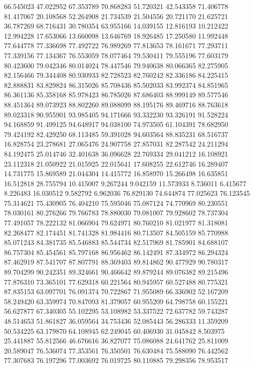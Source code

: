 66.545023
47.022952
67.353789
70.868283
51.720321
42.543358
71.406778
81.417067
20.108568
52.264908
21.734539
21.504556
20.721170
21.625721
36.787269
68.716431
30.780354
63.955166
14.039155
12.816193
10.212422
12.994228
17.653066
13.660098
13.646769
18.926485
17.250580
11.992448
77.644778
77.336698
77.492722
76.989269
77.813653
78.161671
77.293711
77.339156
77.134367
76.553059
78.077464
79.530411
79.555196
77.603179
80.423600
79.042346
80.014024
78.447546
79.940638
80.066365
82.275905
82.156466
79.344408
80.930933
82.728523
82.760242
82.336186
84.225415
82.888831
83.829824
86.315026
85.708436
85.502033
83.992374
84.851965
86.361136
85.358168
85.978423
86.785026
87.686403
88.999149
89.577546
88.451364
89.073923
88.802260
89.088099
88.195176
89.469716
88.763618
89.023318
90.955901
93.985405
94.171666
93.332230
93.326191
91.528224
94.168859
91.499125
94.648917
94.038100
74.973505
61.104391
78.682950
79.424192
82.429250
68.113485
59.391028
94.603564
88.835231
68.516737
16.828754
23.278681
27.065476
24.907758
27.857031
82.287542
24.211294
84.192475
25.014746
32.401638
36.096628
22.769334
29.041212
16.108921
23.112318
21.050922
21.015925
22.015641
17.608255
22.612746
16.289407
14.731775
15.869589
21.044304
14.415772
16.858970
15.266498
16.635851
16.512818
28.755794
10.415007
9.267244
9.042159
11.573933
8.736011
6.415677
8.226483
16.030512
9.582792
6.962036
76.829130
74.644874
77.025623
76.123545
75.314621
75.430905
76.404210
75.595046
75.087124
74.770969
80.230551
78.030161
80.276266
79.766783
78.880030
79.081007
79.928602
78.737304
77.491057
78.222132
81.066904
79.624971
80.760210
81.021977
81.318081
82.268477
82.174451
81.741328
81.984416
80.713507
84.505159
85.770988
85.071243
84.381735
85.546883
85.544734
82.517969
81.785901
84.688107
86.757304
85.454561
85.797168
86.956462
86.142491
87.334972
86.294324
87.462919
87.541707
87.807791
88.369403
89.814862
90.477929
90.780317
89.704299
90.242351
89.324661
90.466642
89.879244
89.076382
89.215496
77.876310
73.365101
77.629318
60.221564
80.945957
60.527488
80.775321
87.835153
63.097701
76.091374
70.722867
71.955089
66.336902
52.167209
58.249420
63.359974
70.847093
81.379057
60.955209
64.798758
60.155221
56.627877
67.340305
55.102295
53.108982
53.337522
72.637782
59.743287
48.514653
51.861827
36.059564
34.753436
52.085443
56.286333
11.359209
50.534225
63.179870
64.108945
62.249045
60.406930
31.045842
8.503975
25.441887
55.812566
46.676616
36.827077
75.086088
24.641762
25.811009
20.589047
76.536074
77.353561
76.350501
76.630484
75.588090
76.442562
77.307683
76.197296
77.003692
76.019725
80.110885
79.298356
78.953517
